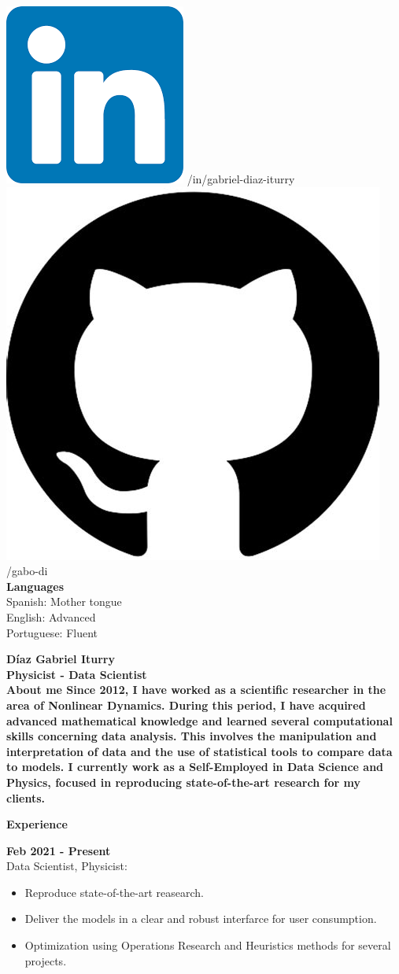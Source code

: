 \documentclass[a4paper,12pt,final]{memoir}
\newcommand{\Sep}{\vspace{1.5em}}
\newcommand{\SmallSep}{\vspace{0.5em}}
\newenvironment{AboutMe}
	{\ignorespaces\textbf{\color{RoyalBlue} About me}}
	{\Sep\ignorespacesafterend}
\newcommand{\CVSection}[1]
	{\Large\textbf{#1}\par
	\SmallSep\normalsize\normalfont}
\newcommand{\CVItem}[1]
	{\textbf{\color{RoyalBlue} #1}}
\begin{document}
\begin{flushleft}
    \includegraphics[width=0.07\columnwidth]{in_icon.png} /in/gabriel-diaz-iturry \\
    \vspace{1mm}
    \includegraphics[width=0.07\columnwidth]{git.jpeg} /gabo-di \\
    \vspace{1mm}
    \vspace{4mm}
	\textbf{Languages}\\
	\vspace{1mm}
	Spanish: Mother tongue\\
	\vspace{1mm}
	English: Advanced\\
	\vspace{1mm}
	Portuguese: Fluent
\end{flushleft}\normalsize


\framebreak



\Huge\bfseries {\color{RoyalBlue} D\'iaz Gabriel Iturry} \\
\Large\bfseries Physicist - Data Scientist\\

\normalsize\normalfont
\vspace{-10pt} 
\begin{AboutMe}
Since 2012, I have worked as a scientific researcher in the area of Nonlinear Dynamics. During this period, I have acquired advanced mathematical knowledge and learned several computational skills concerning data analysis. This involves the manipulation and interpretation of data and the use of statistical tools to compare data to models. I currently work as a Self-Employed in Data Science and Physics, focused in  reproducing state-of-the-art research for my clients.
\end{AboutMe}

\vspace{-15pt} 
\CVSection{Experience}
\CVItem{Feb 2021 - Present}\\
{\small Data Scientist, Physicist:}
\begin{footnotesize}
\begin{itemize}
\item Reproduce state-of-the-art reasearch.
\item Deliver the models in a clear and robust interfarce for user consumption.
\item Optimization using Operations Research and Heuristics methods for several projects.
\end{itemize}
\end{footnotesize}
\SmallSep
\end{document}
